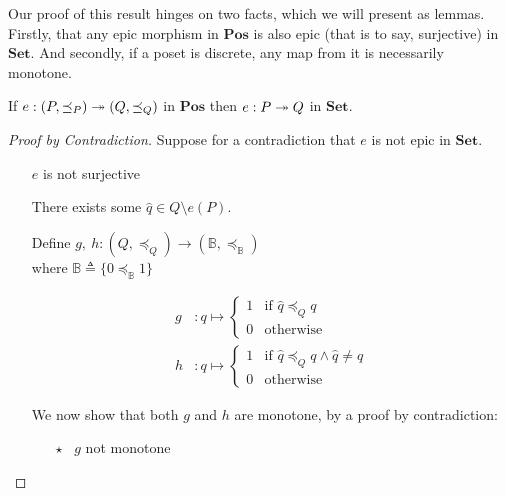 Our proof of this result hinges on two facts, which we will present as lemmas. Firstly, that any epic morphism in $\mathbf{Pos}$ is also epic (that is to say, surjective) in $\mathbf{Set}$. And secondly, if a poset is discrete, any map from it is necessarily monotone.

\begin{lemma}\label{lemma:epic-poset-set}
  If $e : (P, \preceq_P) \twoheadrightarrow (Q, \preceq_Q)$ in $\mathbf{Pos}$ then $e : P \twoheadrightarrow Q$ in $\mathbf{Set}$.

  \begin{proof}[Proof by Contradiction]
    Suppose for a contradiction that $e$ is not epic in $\mathbf{Set}$.

    \begin{itemize}
      \item[\iffs] $e$ is not surjective

      \item[\imps] There exists some $\hat{q}\in Q\setminus e(P)$.

      \addtolength{\itemsep}{.5\baselineskip}
      \item[\phs]
        Define $g,~h : (Q, \preceq_Q) \to (\mathbb{B}, \preceq_{\mathbb{B}})$\\
        where $\mathbb{B}\triangleq\{0 \preceq_{\mathbb{B}} 1\}$

        \begin{align*}
          g & : q \mapsto
          \begin{cases}
            1 & \text{if }\hat{q}\preceq_Q q\\
            0 & \text{otherwise}
          \end{cases}\\
          h & : q \mapsto
          \begin{cases}
            1 & \text{if }\hat{q}\preceq_Q q\wedge\hat{q}\neq q\\
            0 & \text{otherwise}
          \end{cases}
        \end{align*}

        We now show that both $g$ and $h$ are monotone, by a proof by contradiction:

      \addtolength{\itemsep}{-.5\baselineskip}
      \item[\phs]
        \begin{itemize}
          \item[$\star$]
            \Ass~$g$ not monotone
            \marginnote{\Hyp}


\end{itemize}
\end{itemize}
\end{proof}
\end{lemma}
